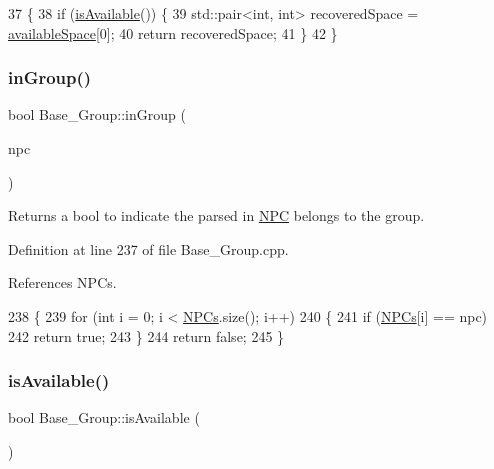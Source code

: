 \begin{DoxyCode}
37 \{
38     \textcolor{keywordflow}{if} (\hyperlink{class_base___group_a6d806401632aa9f7795984bb2b4880f0}{isAvailable}()) \{
39         std::pair<int, int> recoveredSpace = \hyperlink{class_base___group_a8eb46d3107d53da0f5fbea2410b4b095}{availableSpace}[0];
40         \textcolor{keywordflow}{return} recoveredSpace;
41     \}
42 \}
\end{DoxyCode}
\mbox{\label{class_base___group_a216c3f44a7ce30482ae933fc410d86a4}} 
\subsubsection{\texorpdfstring{in\+Group()}{inGroup()}}
{\footnotesize\ttfamily bool Base\+\_\+\+Group\+::in\+Group (\begin{DoxyParamCaption}\item[{std\+::shared\+\_\+ptr$<$ \hyperlink{class_n_p_c}{N\+PC} $>$}]{npc }\end{DoxyParamCaption})}



Returns a bool to indicate the parsed in \hyperlink{class_n_p_c}{N\+PC} belongs to the group. 



Definition at line 237 of file Base\+\_\+\+Group.\+cpp.



References N\+P\+Cs.


\begin{DoxyCode}
238 \{
239     \textcolor{keywordflow}{for} (\textcolor{keywordtype}{int} i = 0; i < \hyperlink{class_base___group_a4757f3c06c73eea029f71b871c1d863e}{NPCs}.size(); i++)
240     \{
241         \textcolor{keywordflow}{if} (\hyperlink{class_base___group_a4757f3c06c73eea029f71b871c1d863e}{NPCs}[i] == npc)
242             \textcolor{keywordflow}{return} \textcolor{keyword}{true};
243     \}
244     \textcolor{keywordflow}{return} \textcolor{keyword}{false};
245 \}
\end{DoxyCode}
\mbox{\label{class_base___group_a6d806401632aa9f7795984bb2b4880f0}} 
\subsubsection{\texorpdfstring{is\+Available()}{isAvailable()}}
{\footnotesize\ttfamily bool Base\+\_\+\+Group\+::is\+Available (\begin{DoxyParamCaption}{ }\end{DoxyParamCaption})}



